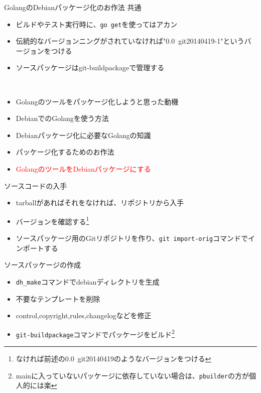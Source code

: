 \begin{frame}{GolangのDebianパッケージ化のお作法}
 共通
 \begin{itemize}
 \item ビルドやテスト実行時に、\texttt{go get}を使ってはアカン
 \item 伝統的なバージョンニングがされていなければ"0.0~git20140419-1"というバージョンをつける
 \item ソースパッケージはgit-buildpackageで管理する
\end{itemize}
\end{frame}


\begin{frame}{　}
\begin{itemize}
  \item Golangのツールをパッケージ化しようと思った動機
  \item DebianでのGolangを使う方法
  \item Debianパッケージ化に必要なGolangの知識
  \item パッケージ化するためのお作法
  \item \textcolor{red}{GolangのツールをDebianパッケージにする}
\end{itemize}
\end{frame}

\begin{frame}{ソースコードの入手}
\begin{itemize}
  \item tarballがあればそれをなければ、リポジトリから入手
  \item バージョンを確認する\footnote{なければ前述の0.0~git20140419のようなバージョンをつける}
  \item ソースパッケージ用のGitリポジトリを作り、\texttt{git import-orig}コマンドでインポートする
\end{itemize}
\end{frame}


\begin{frame}{ソースパッケージの作成}
\begin{itemize}
  \item[1.] \texttt{dh\_make}コマンドでdebianディレクトリを生成
  \item[2.] 不要なテンプレートを削除
  \item[3.] control,copyright,rules,changelogなどを修正
  \item[4.] \texttt{git-buildpackage}コマンドでパッケージをビルド\footnote{mainに入っていないパッケージに依存していない場合は、\texttt{pbuilder}の方が個人的には楽}
\end{itemize}
\end{frame}

